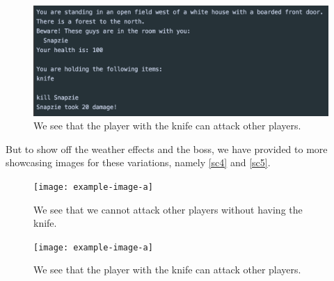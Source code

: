 \begin{figure}[H]
	\centering
	\includegraphics[width=0.8\linewidth]{Materials/Results/AttackingPlayer}
	\caption{We see that the player with the knife can attack other players.}
	\label{sc3}
\end{figure}

But to show off the weather effects and the boss, we have provided to more showcasing images for these variations, namely \autoref{sc4} and \autoref{sc5}.

\begin{figure}[H]
	\centering
	\texttt{[image: example-image-a]}
	\caption{We see that we cannot attack other players without having the knife.}
	\label{sc4}
\end{figure}

\begin{figure}[H]
	\centering
	\texttt{[image: example-image-a]}
	\caption{We see that the player with the knife can attack other players.}
	\label{sc5}
\end{figure}